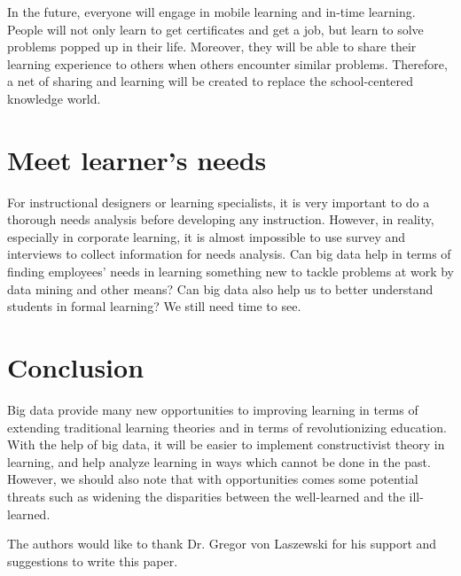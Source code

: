 \documentclass[sigconf]{acmart}
\begin{document}
In the future, everyone will engage in mobile learning and in-time learning. People will not only learn to get certificates and get a job, but learn to solve problems popped up in their life. Moreover, they will be able to share their learning experience to others when others encounter similar problems. Therefore, a net of sharing and learning will be created to replace the school-centered knowledge world.

\section{Meet learner's needs}
For instructional designers or learning specialists, it is very important to do a thorough needs analysis before developing any instruction. However, in reality, especially in corporate learning, it is almost impossible to use survey and interviews to collect information for needs analysis. Can big data help in terms of finding employees' needs in learning something new to tackle problems at work by data mining and other means? Can big data also help us to better understand students in formal learning? We still need time to see.

\section{Conclusion}

Big data provide many new opportunities to improving learning in terms of extending traditional learning theories and in terms of revolutionizing education. With the help of big data, it will be easier to implement constructivist theory in learning, and help analyze learning in ways which cannot be done in the past. However, we should also note that with opportunities comes some potential threats such as widening the disparities between the well-learned and the ill-learned.


\begin{acks}

  The authors would like to thank Dr. Gregor von Laszewski for his
  support and suggestions to write this paper.

\end{acks}


 




\end{document}
